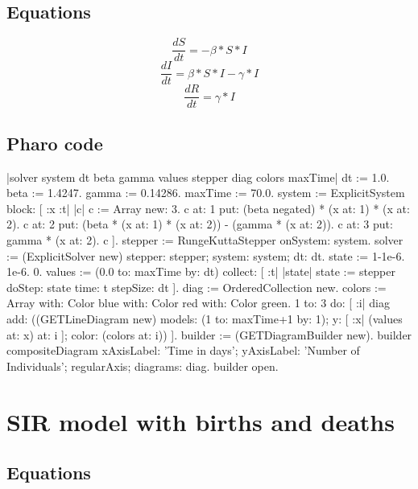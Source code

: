 \documentclass[a4paper,10pt,twoside]{book}
\begin{document}
\subsection{ Equations}\label{ Equations}

\begin{equation}
\frac{dS}{dt} = -\beta*S*I
\end{equation}
\begin{equation}
\frac{dI}{dt} = \beta*S*I-\gamma*I
\end{equation}
\begin{equation}
\frac{dR}{dt} = \gamma*I
\end{equation}
\subsection{ Pharo code}\label{ Pharo code}

\begin{code}{}
|solver system dt beta gamma values stepper diag colors maxTime|
dt := 1.0.
beta := 1.4247.
gamma := 0.14286.
maxTime := 70.0.
system := ExplicitSystem block: [ :x :t| |c|
     c := Array new: 3.
     c at: 1 put: (beta negated) * (x at: 1) * (x at: 2).
     c at: 2 put: (beta * (x at: 1) * (x at: 2)) - (gamma * (x at: 2)).
     c at: 3 put: gamma * (x at: 2).
     c
     ].
stepper := RungeKuttaStepper onSystem: system.
solver := (ExplicitSolver new) stepper: stepper; system: system; dt: dt.
state := { 1-1e-6. 1e-6. 0}.
values := (0.0 to: maxTime by: dt) collect: [ :t| |state| state := stepper doStep: state
                                                          time: t stepSize: dt ].
diag := OrderedCollection new.
colors := Array with: Color blue with: Color red with: Color green.
1 to: 3 do: [ :i|
    diag add:
        ((GETLineDiagram new)
            models: (1 to: maxTime+1 by: 1);
            y: [ :x| (values at: x) at: i ];
            color: (colors at: i))
     ].
builder := (GETDiagramBuilder new).
builder compositeDiagram
    xAxisLabel: 'Time in days';
    yAxisLabel: 'Number of Individuals';
    regularAxis;
    diagrams: diag.
builder open.
\end{code}

\section{ SIR model with births and deaths}\label{ SIR model with births and deaths}\subsection{ Equations}\label{ Equations}
\end{document}
